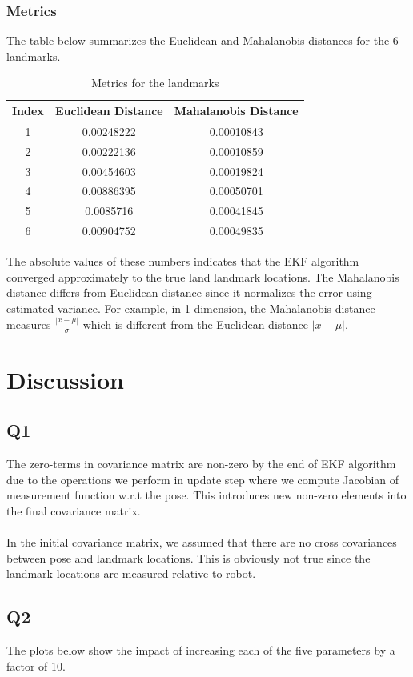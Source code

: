 \documentclass[12pt, a4paper]{article}
\begin{document}
\subsubsection{Metrics}
The table below summarizes the Euclidean and Mahalanobis distances for the 6 landmarks.
\begin{table}[H]
  \centering
  \begin{tabular}{|c|c|c|}
  \hline
  \textbf{Index} & \textbf{Euclidean Distance} & \textbf{Mahalanobis Distance} \\
  \hline
  1 & 0.00248222 & 0.00010843 \\
  2 & 0.00222136 & 0.00010859 \\
  3 & 0.00454603 & 0.00019824 \\
  4 & 0.00886395 & 0.00050701 \\
  5 & 0.0085716 & 0.00041845 \\
  6 & 0.00904752 & 0.00049835 \\
  \hline
  \end{tabular}
  \caption{Metrics for the landmarks}
  \end{table}
\noindent The absolute values of these numbers indicates that the EKF algorithm converged approximately to the true land landmark locations. The Mahalanobis distance differs from Euclidean distance since it normalizes the error using estimated variance. For example, in 1 dimension, the Mahalanobis distance measures $\frac{|x - \mu|}{\sigma}$ which is different from the Euclidean distance $|x - \mu|$.
\section{Discussion}
\subsection{Q1}
The zero-terms in covariance matrix are non-zero by the end of EKF algorithm due to the operations we perform in update step where we compute Jacobian of measurement function w.r.t the pose. This introduces new non-zero elements into the final covariance matrix.\\\\
In the initial covariance matrix, we assumed that there are no cross covariances between pose and landmark locations. This is obviously not true since the landmark locations are measured relative to robot.
\subsection{Q2}
The plots below show the impact of increasing each of the five parameters by a factor of 10.
\end{document}
